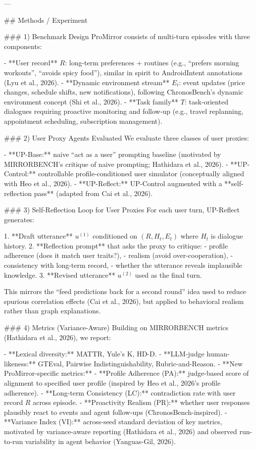 ---

## Methods / Experiment  

### 1) Benchmark Design  
ProMirror consists of multi-turn episodes with three components:

- **User record** \(R\): long-term preferences + routines (e.g., “prefers morning workouts”, “avoids spicy food”), similar in spirit to AndroidIntent annotations (Lyu et al., 2026).  
- **Dynamic environment stream** \(E_t\): event updates (price changes, schedule shifts, new notifications), following ChronosBench’s dynamic environment concept (Shi et al., 2026).  
- **Task family** \(T\): task-oriented dialogues requiring proactive monitoring and follow-up (e.g., travel replanning, appointment scheduling, subscription management).

### 2) User Proxy Agents Evaluated  
We evaluate three classes of user proxies:

- **UP-Base:** naive “act as a user” prompting baseline (motivated by MIRRORBENCH’s critique of naive prompting; Hathidara et al., 2026).  
- **UP-Control:** controllable profile-conditioned user simulator (conceptually aligned with Heo et al., 2026).  
- **UP-Reflect:** UP-Control augmented with a **self-reflection pass** (adapted from Cai et al., 2026).

### 3) Self-Reflection Loop for User Proxies  
For each user turn, UP-Reflect generates:

1. **Draft utterance** \(u^{(1)}\) conditioned on \((R, H_t, E_t)\) where \(H_t\) is dialogue history.  
2. **Reflection prompt** that asks the proxy to critique:  
   - profile adherence (does it match user traits?),  
   - realism (avoid over-cooperation),  
   - consistency with long-term record,  
   - whether the utterance reveals implausible knowledge.  
3. **Revised utterance** \(u^{(2)}\) used as the final turn.

This mirrors the “feed predictions back for a second round” idea used to reduce spurious correlation effects (Cai et al., 2026), but applied to behavioral realism rather than graph explanations.

### 4) Metrics (Variance-Aware)  
Building on MIRRORBENCH metrics (Hathidara et al., 2026), we report:

- **Lexical diversity:** MATTR, Yule’s K, HD-D.  
- **LLM-judge human-likeness:** GTEval, Pairwise Indistinguishability, Rubric-and-Reason.  
- **New ProMirror-specific metrics:**  
  - **Profile Adherence (PA):** judge-based score of alignment to specified user profile (inspired by Heo et al., 2026’s profile adherence).  
  - **Long-term Consistency (LC):** contradiction rate with user record \(R\) across episode.  
  - **Proactivity Realism (PR):** whether user responses plausibly react to events and agent follow-ups (ChronosBench-inspired).  
  - **Variance Index (VI):** across-seed standard deviation of key metrics, motivated by variance-aware reporting (Hathidara et al., 2026) and observed run-to-run variability in agent behavior (Yanguas-Gil, 2026).

